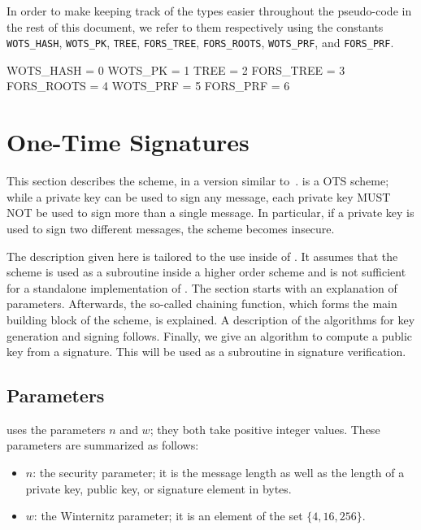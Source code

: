    In order to make keeping track of the types easier throughout the pseudo-code in
   the rest of this document, we refer to them respectively using the constants
   \texttt{WOTS\_HASH}, \texttt{WOTS\_PK}, \texttt{TREE}, \texttt{FORS\_TREE}, \texttt{FORS\_ROOTS}, \texttt{WOTS\_PRF}, and \texttt{FORS\_PRF}.

\begin{code}
  WOTS_HASH  = 0
  WOTS_PK    = 1
  TREE       = 2
  FORS_TREE  = 3
  FORS_ROOTS = 4
  WOTS_PRF   = 5
  FORS_PRF   = 6
\end{code}
   
   
\section{\wotsp One-Time Signatures}\label{sec:wots}
This section describes the \wotsp scheme, in a version similar
to~\cite{Hulsing2013}. \wotsp is a OTS scheme; while a private key can be used
to sign any message, each private key MUST NOT be used to sign more than a single
message. In particular, if a private key is used to sign two different messages,
the scheme becomes insecure. 

The description given here is tailored to the use inside of \spx. It assumes that
the scheme is used as a subroutine inside a higher order scheme and is not sufficient
for a standalone implementation of \wotsp. The section starts with an explanation 
of parameters. Afterwards, the so-called
chaining function, which forms the main building block of the \wotsp scheme, is
explained. A description of the algorithms for key generation and signing follows. 
Finally, we give an algorithm to compute a \wotsp public key from a \wotsp 
signature. This will be used as a subroutine in \spx signature verification.

\subsection{\wotsp Parameters}\label{sec:wots:params}
\wotsp uses the parameters $n$ and $w$; they both take positive integer values.
These parameters are summarized as follows:
\begin{itemize}
  \item $n$: the security parameter; it is the message length as well as the 
  length of a private key, public key, or signature element in bytes. 
  \item $w$: the Winternitz parameter; it is an element of the set $\{4, 16, 256\}$.
\end{itemize}

